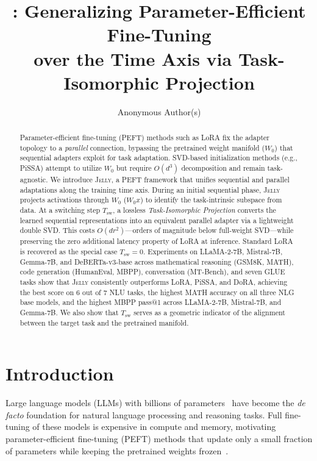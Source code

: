 \documentclass{article}
\title{\jelly{}: Generalizing Parameter-Efficient Fine-Tuning\\over the Time Axis via Task-Isomorphic Projection}
\author{Anonymous Author(s)}
\newcommand{\Wbase}{W_0}
\newcommand{\Tswitch}{T_{\mathrm{sw}}}
\newcommand{\jelly}{\textsc{Jelly}}
\begin{document}
\maketitle

\begin{abstract}
Parameter-efficient fine-tuning (PEFT) methods such as LoRA fix the adapter topology to a \emph{parallel} connection, bypassing the pretrained weight manifold ($\Wbase$) that sequential adapters exploit for task adaptation.
SVD-based initialization methods (e.g., PiSSA) attempt to utilize $\Wbase$ but require $O(d^3)$ decomposition and remain task-agnostic.
We introduce \jelly{}, a PEFT framework that unifies sequential and parallel adaptations along the training time axis.
During an initial sequential phase, \jelly{} projects activations through $\Wbase$ ($\Wbase x$) to identify the task-intrinsic subspace from data.
At a switching step $\Tswitch$, a lossless \emph{Task-Isomorphic Projection} converts the learned sequential representations into an equivalent parallel adapter via a lightweight double SVD.
This costs $O(dr^2)$---orders of magnitude below full-weight SVD---while preserving the zero additional latency property of LoRA at inference.
Standard LoRA is recovered as the special case $\Tswitch = 0$.
Experiments on LLaMA-2-7B, Mistral-7B, Gemma-7B, and DeBERTa-v3-base across mathematical reasoning (GSM8K, MATH), code generation (HumanEval, MBPP), conversation (MT-Bench), and seven GLUE tasks show that \jelly{} consistently outperforms LoRA, PiSSA, and DoRA, achieving the best score on 6 out of 7 NLU tasks, the highest MATH accuracy on all three NLG base models, and the highest MBPP pass@1 across LLaMA-2-7B, Mistral-7B, and Gemma-7B.
We also show that $\Tswitch$ serves as a geometric indicator of the alignment between the target task and the pretrained manifold.
\end{abstract}
\section{Introduction}
\label{sec:intro}

Large language models (LLMs) with billions of parameters~\citep{brown2020gpt3, touvron2023llama2} have become the \emph{de facto} foundation for natural language processing and reasoning tasks.
Full fine-tuning of these models is expensive in compute and memory, motivating parameter-efficient fine-tuning (PEFT) methods that update only a small fraction of parameters while keeping the pretrained weights frozen~\citep{lialin2023scaling}.
\end{document}
